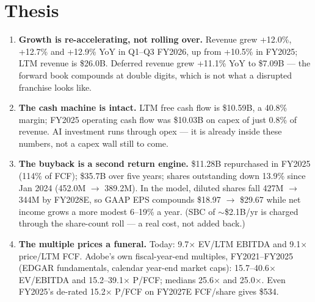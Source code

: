 \documentclass[9pt]{extarticle}
\begin{document}
\section*{Thesis}
\begin{enumerate}
\item \textbf{Growth is re-accelerating, not rolling over.} Revenue grew +12.0\%, +12.7\% and +12.9\% YoY in Q1--Q3 FY2026, up from +10.5\% in FY2025; LTM revenue is \$26.0B. Deferred revenue grew +11.1\% YoY to \$7.09B --- the forward book compounds at double digits, which is not what a disrupted franchise looks like.
\item \textbf{The cash machine is intact.} LTM free cash flow is \$10.59B, a 40.8\% margin; FY2025 operating cash flow was \$10.03B on capex of just 0.8\% of revenue. AI investment runs through opex --- it is already inside these numbers, not a capex wall still to come.
\item \textbf{The buyback is a second return engine.} \$11.28B repurchased in FY2025 (114\% of FCF); \$35.7B over five years; shares outstanding down 13.9\% since Jan 2024 (452.0M $\rightarrow$ 389.2M). In the model, diluted shares fall 427M $\rightarrow$ 344M by FY2028E, so GAAP EPS compounds \$18.97 $\rightarrow$ \$29.67 while net income grows a more modest 6--19\% a year. (SBC of $\sim$\$2.1B/yr is charged through the share-count roll --- a real cost, not added back.)
\item \textbf{The multiple prices a funeral.} Today: 9.7$\times$ EV/LTM EBITDA and 9.1$\times$ price/LTM FCF. Adobe's own fiscal-year-end multiples, FY2021--FY2025 (EDGAR fundamentals, calendar year-end market caps): 15.7--40.6$\times$ EV/EBITDA and 15.2--39.1$\times$ P/FCF; medians 25.6$\times$ and 25.0$\times$. Even FY2025's de-rated 15.2$\times$ P/FCF on FY2027E FCF/share gives \$534.
\end{enumerate}
\end{document}
